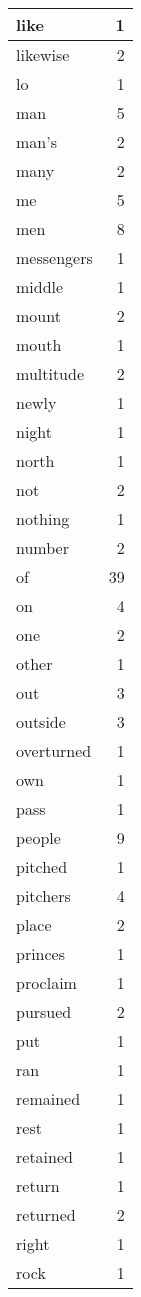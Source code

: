 \begin{center}
\begin{longtable}{l|r}
like & 1\\ \hline 
likewise & 2\\ \hline 
lo & 1\\ \hline 
man & 5\\ \hline 
man's & 2\\ \hline 
many & 2\\ \hline 
me & 5\\ \hline 
men & 8\\ \hline 
messengers & 1\\ \hline 
middle & 1\\ \hline 
mount & 2\\ \hline 
mouth & 1\\ \hline 
multitude & 2\\ \hline 
newly & 1\\ \hline 
night & 1\\ \hline 
north & 1\\ \hline 
not & 2\\ \hline 
nothing & 1\\ \hline 
number & 2\\ \hline 
of & 39\\ \hline 
on & 4\\ \hline 
one & 2\\ \hline 
other & 1\\ \hline 
out & 3\\ \hline 
outside & 3\\ \hline 
overturned & 1\\ \hline 
own & 1\\ \hline 
pass & 1\\ \hline 
people & 9\\ \hline 
pitched & 1\\ \hline 
pitchers & 4\\ \hline 
place & 2\\ \hline 
princes & 1\\ \hline 
proclaim & 1\\ \hline 
pursued & 2\\ \hline 
put & 1\\ \hline 
ran & 1\\ \hline 
remained & 1\\ \hline 
rest & 1\\ \hline 
retained & 1\\ \hline 
return & 1\\ \hline 
returned & 2\\ \hline 
right & 1\\ \hline 
rock & 1\\ \hline 

\end{longtable}
\end{center}
